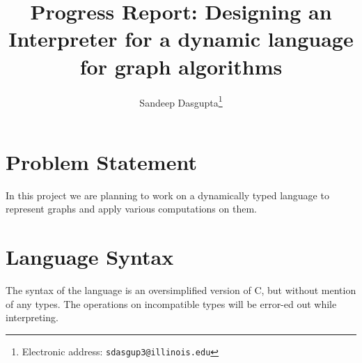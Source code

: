 \documentclass[12,twoside]{article}
\title{\textbf{Progress Report: Designing an Interpreter for a dynamic language 
  for graph algorithms}}
\author{Sandeep Dasgupta\thanks{Electronic address:
\texttt{sdasgup3@illinois.edu}}}
\begin{document}
\begin{titlepage}
\thispagestyle{empty}
\maketitle
\pagebreak
\end{titlepage}

\section{Problem Statement}

   In this project we are planning to work on a dynamically typed language to 
   represent graphs and apply various computations on them.
 
\section{Language Syntax}
  The syntax of the language is an oversimplified version  of C, but
    without mention of any types. The operations on incompatible types
    will be error-ed out while interpreting.
\end{document}
